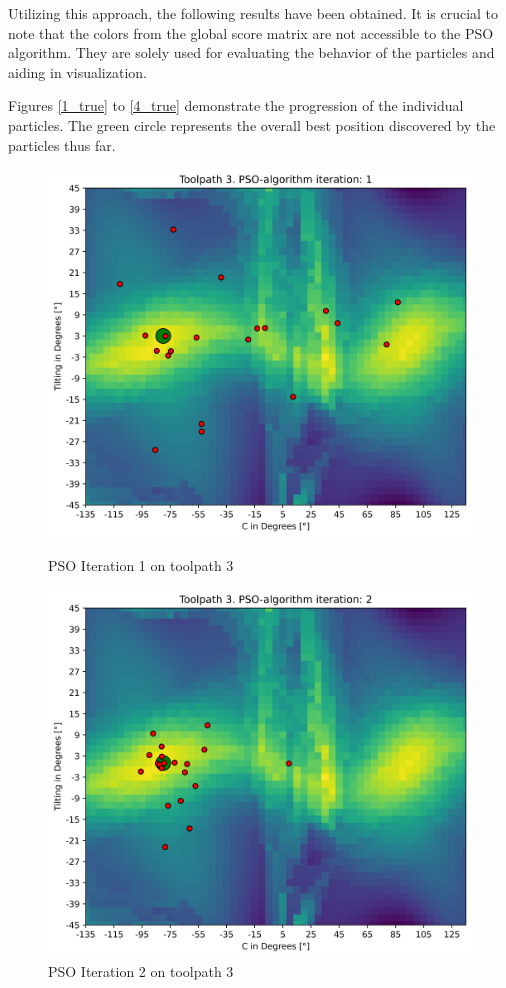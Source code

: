 Utilizing this approach, the following results have been obtained. It is crucial to note that the colors from the global score matrix are not accessible to the \acrshort{PSO} algorithm. They are solely used for evaluating the behavior of the particles and aiding in visualization.

Figures \ref{1_true} to \ref{4_true} demonstrate the progression of the individual particles. The green circle represents the overall best position discovered by the particles thus far.

\begin{figure}[H]
	\centering
	\begin{minipage}{0.5\textwidth}
		\includegraphics[width=\textwidth]{figures/swarm_true/3_1.png}
		\caption{PSO Iteration 1 on toolpath 3}
		\label{1_true}
	\end{minipage}\hfill
	\begin{minipage}{0.5\textwidth}
		\includegraphics[width=\textwidth]{figures/swarm_true/3_2.png}
		\caption{PSO Iteration 2 on toolpath 3}
		\label{2_true}
	\end{minipage}\par
\end{figure}	

